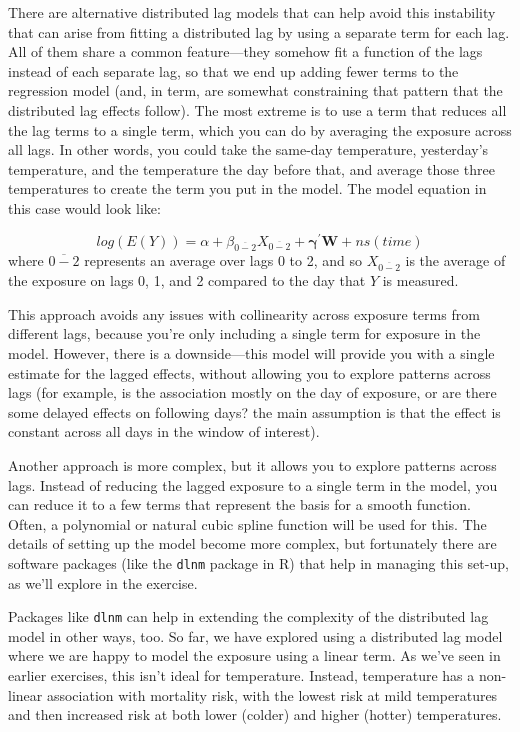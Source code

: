 \documentclass[
]{book}
\begin{document}
There are alternative distributed lag models that can help avoid this instability that can
arise from fitting a distributed lag by using a separate term for each lag. All of them share
a common feature---they somehow fit a function of the lags instead of each separate lag, so
that we end up adding fewer terms to the regression model (and, in term, are somewhat
constraining that pattern that the distributed lag effects follow). The most extreme
is to use a term that reduces all the lag terms to a single term, which you can do by
averaging the exposure across all lags. In other words, you could take the same-day
temperature, yesterday's temperature, and the temperature the day before that, and average
those three temperatures to create the term you put in the model. The model equation
in this case would look like:

\[
log(E(Y)) = \alpha + \beta_{\overline{0-2}} X_{\overline{0-2}} + \mathbf{\gamma^{'}W} + ns(time)
\]
where \(\overline{0-2}\) represents an average over lags 0 to 2, and so \(X_{\overline{0-2}}\)
is the average of the exposure on lags 0, 1, and 2 compared to the day that \(Y\) is
measured.

This approach avoids any issues with collinearity across exposure terms from different
lags, because you're only including a single term for exposure in the model. However,
there is a downside---this model will provide you with a single estimate for the
lagged effects, without allowing you to explore patterns across lags (for example,
is the association mostly on the day of exposure, or are there some delayed effects on
following days? the main assumption is that the effect is constant across all days in the
window of interest).

Another approach is more complex, but it allows you to explore patterns across lags.
Instead of reducing the lagged exposure to a single term in the model, you can reduce
it to a few terms that represent the basis for a smooth function. Often, a polynomial
or natural cubic spline function will be used for this. The details of setting up the
model become more complex, but fortunately there are software packages (like the \texttt{dlnm}
package in R) that help in managing this set-up, as we'll explore in the exercise.

Packages like \texttt{dlnm} can help in extending the complexity of the distributed lag model
in other ways, too. So far, we have explored using a distributed lag model where we
are happy to model the exposure using a linear term. As we've seen in earlier exercises,
this isn't ideal for temperature. Instead, temperature has a non-linear association
with mortality risk, with the lowest risk at mild temperatures and then increased risk
at both lower (colder) and higher (hotter) temperatures.
\end{document}
